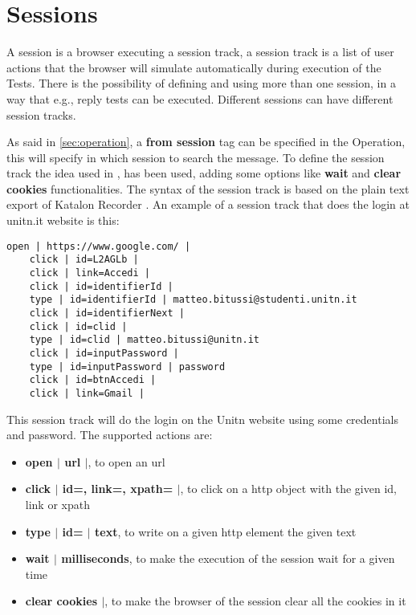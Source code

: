 \section{Sessions}
A session is a browser executing a \gls{session track}, a \gls{session track} is a list of user actions that the browser will simulate automatically during execution of the Tests. There is the possibility of defining and using more than one session, in a way that e.g., reply tests can be executed. Different sessions can have different session tracks.

As said in \ref{sec:operation}, a \textbf{from session} tag can be specified in the Operation, this will specify in which session to search the message. To define the \gls{session track} the idea used in \cite{giulio_pellizzari,claudio_grisenti,stefano_facchini}, has been used, adding some options like \textbf{wait} and \textbf{clear cookies} functionalities.
The syntax of the \gls{session track} is based on the plain text export of Katalon Recorder \cite{katalon_recorder_syntax}. 
An example of a \gls{session track} that does the login at unitn.it website is this:

\begin{lstlisting}[caption=Session track Unitn login]
    open | https://www.google.com/ |
    click | id=L2AGLb |
    click | link=Accedi |
    click | id=identifierId |
    type | id=identifierId | matteo.bitussi@studenti.unitn.it
    click | id=identifierNext |
    click | id=clid |
    type | id=clid | matteo.bitussi@unitn.it
    click | id=inputPassword |
    type | id=inputPassword | password
    click | id=btnAccedi |
    click | link=Gmail |
\end{lstlisting}

This \gls{session track} will do the login on the Unitn website using some credentials and password. The supported actions are:
\begin{itemize}
    \item \textbf{open $|$ url $|$}, to open an url
    \item \textbf{click $|$ id=, link=, xpath= $|$}, to click on a http object with the given id, link or xpath
    \item \textbf{type $|$ id= $|$ text}, to write on a given http element the given text
    \item \textbf{wait $|$ milliseconds}, to make the execution of the session wait for a given time 
    \item \textbf{clear cookies $|$}, to make the browser of the session clear all the cookies in it
\end{itemize}


 
